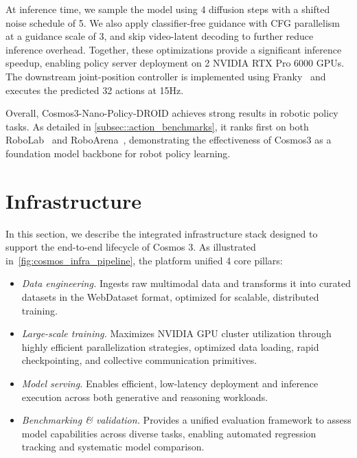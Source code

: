 \documentclass{llmxive}
\begin{document}
At inference time, we sample the model using 4 diffusion steps with a shifted noise schedule of 5. We also apply classifier-free guidance with CFG parallelism at a guidance scale of 3, and skip video-latent decoding to further reduce inference overhead. Together, these optimizations provide a significant inference speedup, enabling policy server deployment on 2 NVIDIA RTX Pro 6000 GPUs. The downstream joint-position controller is implemented using Franky~\citep{Schneider_franky_High-Level_Control} and executes the predicted 32 actions at 15Hz.

Overall, Cosmos3-Nano-Policy-DROID achieves strong results in robotic policy tasks. As detailed in \cref{subsec::action_benchmarks}, it ranks first on both RoboLab~\citep{yang2026robolab} and RoboArena~\citep{atreya2025roboarena}, demonstrating the effectiveness of Cosmos3 as a foundation model backbone for robot policy learning.
\section{Infrastructure}
\label{sec::infrastructure}

In this section, we describe the integrated infrastructure stack designed to support the end-to-end lifecycle of Cosmos 3. As illustrated in~\cref{fig:cosmos_infra_pipeline}, the platform unified 4 core pillars:
\begin{itemize}
    \item \textit{Data engineering.} Ingests raw multimodal data and transforms it into curated datasets in the WebDataset format, optimized for scalable, distributed training.
    \item \textit{Large-scale training.} Maximizes NVIDIA GPU cluster utilization through highly efficient parallelization strategies, optimized data loading, rapid checkpointing, and collective communication primitives.
    \item \textit{Model serving.} Enables efficient, low-latency deployment and inference execution across both generative and reasoning workloads.
    \item \textit{Benchmarking \& validation.} Provides a unified evaluation framework to assess model capabilities across diverse tasks, enabling automated regression tracking and systematic model comparison.
\end{itemize}
\end{document}
